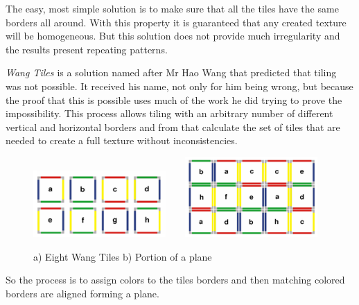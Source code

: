 The easy, most simple solution is to make sure that all the tiles have the same borders all around. With this property it is guaranteed that any created texture will be homogeneous. But this solution does not provide much irregularity and the results present repeating patterns. 



\emph{Wang Tiles \cite{Cohen2003}} is a solution named after Mr Hao Wang that predicted that tiling was not possible. It received his name, not only for him being wrong, but because the proof that this is possible uses much of the work he did trying to prove the impossibility. This process allows tiling with an arbitrary number of different vertical and horizontal borders and from that calculate the set of tiles that are needed to create a full texture without inconsistencies. 



\begin{figure}
        \centering
			\includegraphics[width=0.45\textwidth]{img/Theory/Tiling/tiles.png}
        ~ ~%
			\includegraphics[width=0.45\textwidth]{img/Theory/Tiling/plane.png}
        \caption{a) Eight Wang Tiles b) Portion of a plane}
        \label{fig:WangTiles}
\end{figure}

So the process is to assign colors to the tiles borders and then matching colored borders are aligned forming a plane.

